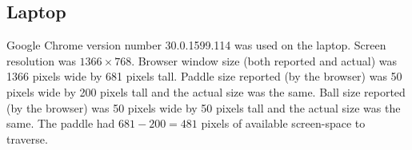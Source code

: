 \documentclass[a4paper,10pt]{article}
\begin{document}






\subsection{Laptop}

Google Chrome version number 30.0.1599.114 was used on the laptop. Screen resolution was $1366\times768$. Browser window size (both reported and actual) was 1366 pixels wide by 681 pixels tall. Paddle size reported (by the browser) was 50 pixels wide by 200 pixels tall and the actual size was the same. Ball size reported (by the browser) was 50 pixels wide by 50 pixels tall and the actual size was the same. The paddle had $681-200=481$ pixels of available screen-space to traverse.  
\end{document}
